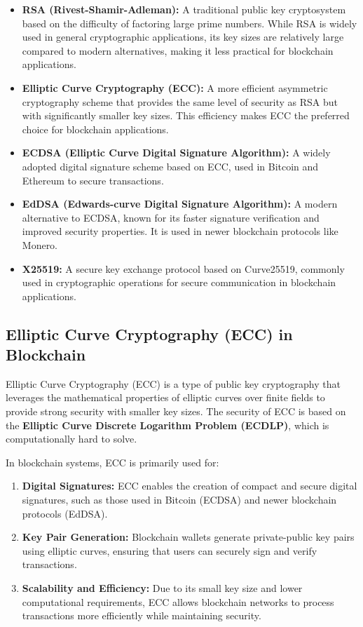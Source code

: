 \documentclass{article}
\begin{document}
\begin{itemize}
    \item \textbf{RSA (Rivest-Shamir-Adleman):} A traditional public key cryptosystem based on the difficulty of factoring large prime numbers. While RSA is widely used in general cryptographic applications, its key sizes are relatively large compared to modern alternatives, making it less practical for blockchain applications.
    \item \textbf{Elliptic Curve Cryptography (ECC):} A more efficient asymmetric cryptography scheme that provides the same level of security as RSA but with significantly smaller key sizes. This efficiency makes ECC the preferred choice for blockchain applications.
    \item \textbf{ECDSA (Elliptic Curve Digital Signature Algorithm):} A widely adopted digital signature scheme based on ECC, used in Bitcoin and Ethereum to secure transactions.
    \item \textbf{EdDSA (Edwards-curve Digital Signature Algorithm):} A modern alternative to ECDSA, known for its faster signature verification and improved security properties. It is used in newer blockchain protocols like Monero.
    \item \textbf{X25519:} A secure key exchange protocol based on Curve25519, commonly used in cryptographic operations for secure communication in blockchain applications.
\end{itemize}

\subsection*{Elliptic Curve Cryptography (ECC) in Blockchain}
Elliptic Curve Cryptography (ECC) is a type of public key cryptography that leverages the mathematical properties of elliptic curves over finite fields to provide strong security with smaller key sizes. The security of ECC is based on the \textbf{Elliptic Curve Discrete Logarithm Problem (ECDLP)}, which is computationally hard to solve.

In blockchain systems, ECC is primarily used for:
\begin{enumerate}
    \item \textbf{Digital Signatures:} ECC enables the creation of compact and secure digital signatures, such as those used in Bitcoin (ECDSA) and newer blockchain protocols (EdDSA).
    \item \textbf{Key Pair Generation:} Blockchain wallets generate private-public key pairs using elliptic curves, ensuring that users can securely sign and verify transactions.
    \item \textbf{Scalability and Efficiency:} Due to its small key size and lower computational requirements, ECC allows blockchain networks to process transactions more efficiently while maintaining security.
\end{enumerate}
\end{document}
